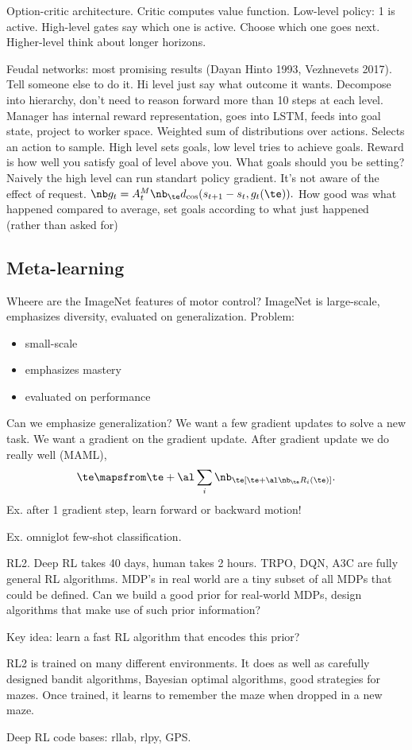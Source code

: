 Option-critic architecture. Critic computes value function. Low-level policy: 1 is active. High-level gates say which one is active. Choose which one goes next. Higher-level think about longer horizons.

Feudal networks: most promising results (Dayan Hinto 1993, Vezhnevets 2017). Tell someone else to do it. Hi level just say what outcome it wants. Decompose into hierarchy, don't need to reason forward more than 10 steps at each level.
Manager has internal reward representation, goes into LSTM, feeds into goal state, project to worker space. Weighted sum of distributions over actions. Selects an action to sample. High level sets goals, low level tries to achieve goals. Reward is how well you satisfy goal of level above you. What goals should you be setting?  Naively the high level can run standart policy gradient. It's not aware of the effect of request. $\nb g_t = A_t^M \nb_\te d_{\cos}(s_{t+1}-s_t, g_t(\te)).$ How good was what happened compared to average, set goals according to what just happened (rather than asked for)



\subsection{Meta-learning}

Wheere are the ImageNet features of motor control?  ImageNet is large-scale, emphasizes diversity, evaluated on generalization.
Problem:
\begin{itemize}
\item
small-scale
\item
emphasizes mastery
\item
evaluated on performance
\end{itemize}
Can we emphasize generalization? We want a few gradient updates to solve a new task. We want a gradient on the gradient update. After gradient update we do really well (MAML),
$$
\te \mapsfrom \te + \al \sum_i \nb_\te[\te + \al \nb_\te R_i(\te)].
$$
Ex. after 1 gradient step, learn forward or backward motion!

Ex. omniglot few-shot classification.  %


RL2. Deep RL takes 40 days, human takes 2 hours.
TRPO, DQN, A3C are fully general RL algorithms. MDP's in real world are a tiny subset of all MDPs that could be defined. Can we build a good prior for real-world MDPs, design algorithms that make use of such prior information?

Key idea: learn a fast RL algorithm that encodes this prior?

RL2 is trained on many different environments. It does as well as carefully designed bandit algorithms, Bayesian optimal algorithms, good strategies for mazes. Once trained, it learns to remember the maze when dropped in a new maze.

Deep RL code bases: rllab, rlpy, GPS.

